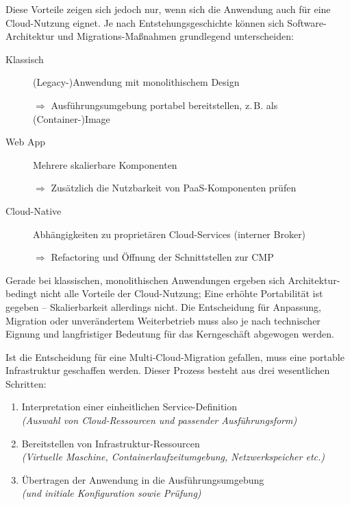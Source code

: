 
\noindent
Diese Vorteile zeigen sich jedoch nur, wenn sich die Anwendung auch für eine Cloud-Nutzung eignet. Je nach Entstehungsgeschichte können sich Software-Architektur und Migrations-Maßnahmen grundlegend unterscheiden:

\begin{description}
	
	\item[Klassisch] (Legacy-)Anwendung mit monolithischem Design
	
	$\Rightarrow$ Ausführungsumgebung portabel bereitstellen, z.\,B. als (Container-)Image
	
	\item[Web App] Mehrere skalierbare Komponenten
	
	$\Rightarrow$ Zusätzlich die Nutzbarkeit von PaaS-Komponenten prüfen
	
	\item[Cloud-Native] Abhängigkeiten zu proprietären Cloud-Services (interner Broker)
	
	$\Rightarrow$ Refactoring und Öffnung der Schnittstellen zur CMP
	
\end{description}

\noindent
Gerade bei klassischen, monolithischen Anwendungen ergeben sich Architektur-bedingt nicht alle Vorteile der Cloud-Nutzung; Eine erhöhte Portabilität ist gegeben --  Skalierbarkeit allerdings nicht. Die Entscheidung für Anpassung, Migration oder unverändertem Weiterbetrieb muss also je nach technischer Eignung und langfristiger Bedeutung für das Kerngeschäft abgewogen werden.

Ist die Entscheidung für eine Multi-Cloud-Migration gefallen, muss eine portable Infrastruktur geschaffen werden. Dieser Prozess besteht aus drei wesentlichen Schritten:

\begin{enumerate}
	
	\item Interpretation einer einheitlichen Service-Definition
	\\\emph{(Auswahl von Cloud-Ressourcen und passender Ausführungsform)}
	
	\item Bereitstellen von Infrastruktur-Ressourcen 
	\\\emph{(Virtuelle Maschine, Containerlaufzeitumgebung, Netzwerkspeicher etc.)}
	
	\item Übertragen der Anwendung in die Ausführungsumgebung
	\\\emph{(und initiale Konfiguration sowie Prüfung)}
	
\end{enumerate}

